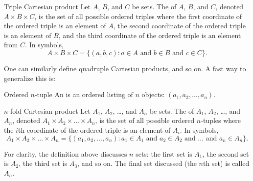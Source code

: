 \documentclass{book}
\theoremstyle{ekimcustom}
\newcommand\defn[1]{{\color{blue}{\bf #1}}}
\begin{document}
\begin{bdefinition}{Triple Cartesian product}{}
Let $A$, $B$, and $C$ be sets. The \defn{Cartesian product} of $A$, $B$, and $C$, denoted $A \times B \times C$, is the set of all possible ordered triples where the first coordinate of the ordered triple is an element of $A$, the second coordinate of the ordered triple is an element of $B$, and the third coordinate of the ordered triple is an element from $C$. In symbols,
\[A \times B \times C = \{ (a,b,c) : a \in A \text{ and } b \in B \text{ and } c \in C\}.\]
\end{bdefinition}
One can similarly define quadruple Cartesian products, and so on. A fast way to generalize this is:
\begin{bdefinition}{Ordered $n$-tuple}{}
An \defn{$n$-tuple} is an ordered listing of $n$ objects: $(a_1,a_2,\dots,a_n)$.
\end{bdefinition}
\begin{bdefinition}{$n$-fold Cartesian product}{}
Let $A_1$, $A_2$, \dots, and $A_n$ be sets. The \defn{Cartesian product} of $A_1$, $A_2$, \dots, and $A_n$, denoted $A_1 \times A_2 \times \dots \times A_n$, is the set of all possible ordered $n$-tuples where the $i$th coordinate of the ordered triple is an element of $A_i$. In symbols,
\[A_1 \times A_2 \times \dots \times A_n = \{ (a_1,a_2,\dots,a_n) : a_1 \in A_1 \text{ and } a_2 \in A_2 \text{ and } \dots \text{ and } a_n \in A_n\}.\]
\end{bdefinition}
For clarity, the definition above discusses $n$ sets: the first set is $A_1$, the second set is $A_2$, the third set is $A_3$, and so on. The final set discussed (the $n$th set) is called $A_n$.
\end{document}
